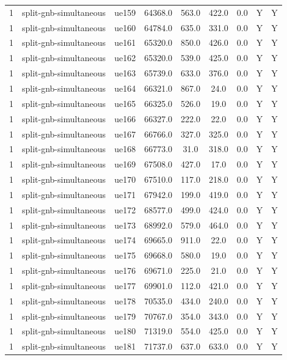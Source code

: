\begin{table}[ht]
\begin{tabular}{|c|c|c|c|c|c|c|c|c|}
1 & split-gnb-simultaneous & ue159 & 64368.0 & 563.0 & 422.0 & 0.0 & Y & Y \\
1 & split-gnb-simultaneous & ue160 & 64784.0 & 635.0 & 331.0 & 0.0 & Y & Y \\
1 & split-gnb-simultaneous & ue161 & 65320.0 & 850.0 & 426.0 & 0.0 & Y & Y \\
1 & split-gnb-simultaneous & ue162 & 65320.0 & 539.0 & 425.0 & 0.0 & Y & Y \\
1 & split-gnb-simultaneous & ue163 & 65739.0 & 633.0 & 376.0 & 0.0 & Y & Y \\
1 & split-gnb-simultaneous & ue164 & 66321.0 & 867.0 & 24.0 & 0.0 & Y & Y \\
1 & split-gnb-simultaneous & ue165 & 66325.0 & 526.0 & 19.0 & 0.0 & Y & Y \\
1 & split-gnb-simultaneous & ue166 & 66327.0 & 222.0 & 22.0 & 0.0 & Y & Y \\
1 & split-gnb-simultaneous & ue167 & 66766.0 & 327.0 & 325.0 & 0.0 & Y & Y \\
1 & split-gnb-simultaneous & ue168 & 66773.0 & 31.0 & 318.0 & 0.0 & Y & Y \\
1 & split-gnb-simultaneous & ue169 & 67508.0 & 427.0 & 17.0 & 0.0 & Y & Y \\
1 & split-gnb-simultaneous & ue170 & 67510.0 & 117.0 & 218.0 & 0.0 & Y & Y \\
1 & split-gnb-simultaneous & ue171 & 67942.0 & 199.0 & 419.0 & 0.0 & Y & Y \\
1 & split-gnb-simultaneous & ue172 & 68577.0 & 499.0 & 424.0 & 0.0 & Y & Y \\
1 & split-gnb-simultaneous & ue173 & 68992.0 & 579.0 & 464.0 & 0.0 & Y & Y \\
1 & split-gnb-simultaneous & ue174 & 69665.0 & 911.0 & 22.0 & 0.0 & Y & Y \\
1 & split-gnb-simultaneous & ue175 & 69668.0 & 580.0 & 19.0 & 0.0 & Y & Y \\
1 & split-gnb-simultaneous & ue176 & 69671.0 & 225.0 & 21.0 & 0.0 & Y & Y \\
1 & split-gnb-simultaneous & ue177 & 69901.0 & 112.0 & 421.0 & 0.0 & Y & Y \\
1 & split-gnb-simultaneous & ue178 & 70535.0 & 434.0 & 240.0 & 0.0 & Y & Y \\
1 & split-gnb-simultaneous & ue179 & 70767.0 & 354.0 & 343.0 & 0.0 & Y & Y \\
1 & split-gnb-simultaneous & ue180 & 71319.0 & 554.0 & 425.0 & 0.0 & Y & Y \\
1 & split-gnb-simultaneous & ue181 & 71737.0 & 637.0 & 633.0 & 0.0 & Y & Y \\

\end{tabular}
\end{table}
